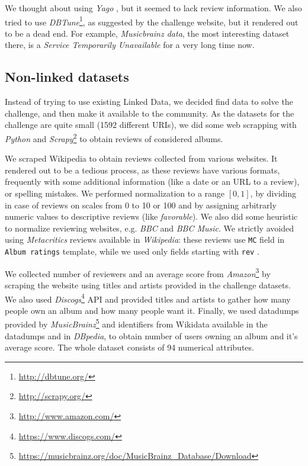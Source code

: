 \documentclass{llncs}
\begin{document}
We thought about using \emph{Yago} \cite{yago}, but it seemed to lack review information.
We also tried to use \emph{DBTune}\footnote{\url{http://dbtune.org/}}, as suggested by the challenge website, but it rendered out to be a dead end.
For example, \emph{Musicbrainz data}, the most interesting dataset there, is a \emph{Service Temporarily Unavailable} for a very long time now.

\subsection{Non-linked datasets\label{sec:nonld}}
Instead of trying to use existing Linked Data, we decided find data to solve the challenge, and then make it available to the community.
As the datasets for the challenge are quite small (1592 different URIs), we did some web scrapping with \emph{Python} and \emph{Scrapy}\footnote{\url{http://scrapy.org/}} to obtain reviews of considered albums.

We scraped Wikipedia to obtain reviews collected from various websites.
It rendered out to be a tedious process, as these reviews have various formats, frequently with some additional information (like a date or an URL to a review), or spelling mistakes.
We performed normalization to a range $\left[0,1\right]$, by dividing in case of reviews on scales from 0 to 10 or 100 and by assigning arbitrarly numeric values to descriptive reviews (like \emph{favorable}).
We also did some heuristic to normalize reviewing websites, e.g. \emph{BBC} and \emph{BBC Music}.
We strictly avoided using \emph{Metacritics} reviews available in \emph{Wikipedia}: these reviews use \texttt{MC} field in \texttt{Album ratings} template, while we used only fields starting with \texttt{rev} \cite{album_ratings}.

We collected number of reviewers and an average score from \emph{Amazon}\footnote{\url{http://www.amazon.com/}} by scraping the website using titles and artists provided in the challenge datasets.
We also used \emph{Discogs}\footnote{\url{https://www.discogs.com/}} API and provided titles and artists to gather how many people own an album and how many people want it.
Finally, we used datadumps provided by \emph{MusicBrainz}\footnote{\url{https://musicbrainz.org/doc/MusicBrainz_Database/Download}} \cite{musicbrainz} and identifiers from Wikidata \cite{wikidata} available in the datadumps and in \emph{DBpedia}, to obtain number of users owning an album and it's average score.
The whole dataset consists of 94 numerical attributes.
\end{document}
